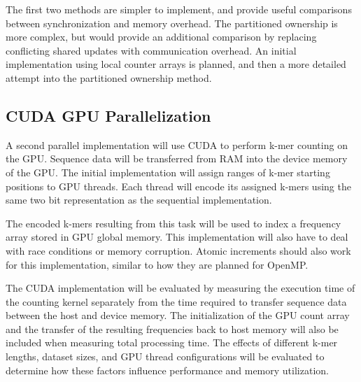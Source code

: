 \documentclass{article}
\begin{document}
The first two methods are simpler to implement, and provide useful comparisons between synchronization and memory overhead. The partitioned ownership 
is more complex, but would provide an additional comparison by replacing conflicting shared updates with communication overhead. An initial implementation 
using local counter arrays is planned, and then a more detailed attempt into the partitioned ownership method.


\vspace{\baselineskip}


\subsection{CUDA GPU Parallelization}

\vspace{\baselineskip}

A second parallel implementation will use CUDA to perform k-mer counting on the GPU. Sequence data will be transferred from RAM into the device memory 
of the GPU. The initial implementation will assign ranges of k-mer starting positions to GPU threads. Each thread will encode its assigned k-mers using the 
same two bit representation as the sequential implementation. 

\vspace{\baselineskip}

The encoded k-mers resulting from this task will be used to index a frequency array stored in GPU global memory. This implementation will also have to 
deal with race conditions or memory corruption. Atomic increments should also work for this implementation, similar to how they are planned for OpenMP. 

\vspace{\baselineskip}

The CUDA implementation will be evaluated by measuring the execution time of the counting kernel separately from the time required to transfer sequence data 
between the host and device memory. The initialization of the GPU count array and the transfer of the resulting frequencies back to host memory will also 
be included when measuring total processing time. The effects of different k-mer lengths, dataset sizes, and GPU thread configurations will be
evaluated to determine how these factors influence performance and memory utilization.

\newpage
\end{document}
